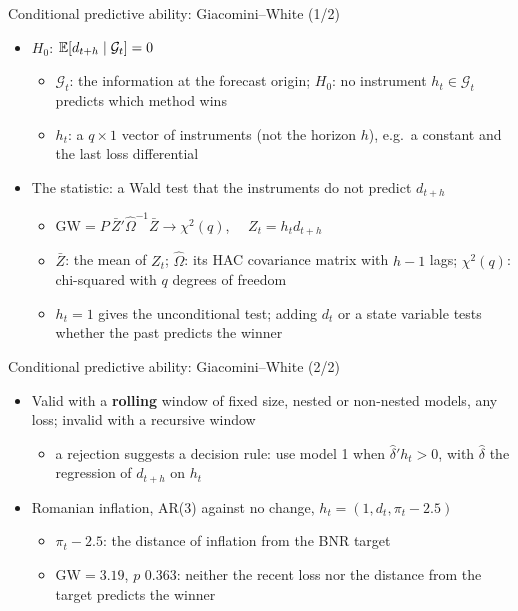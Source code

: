 \begin{frame}{Conditional predictive ability: Giacomini--White (1/2)}
\itemsize{\small}
\begin{itemize}
    \item $H_0$: $\mathbb{E}[d_{t+h} \mid \mathcal{G}_t] = 0$ 
    \begin{itemize}
        \item $\mathcal{G}_t$: the information at the forecast origin; $H_0$: no instrument $h_t \in \mathcal{G}_t$ predicts which method wins
        \item $h_t$: a $q \times 1$ vector of instruments (not the horizon $h$), e.g.\ a constant and the last loss differential
    \end{itemize}
    \item The statistic: a Wald test that the instruments do not predict $d_{t+h}$
    \begin{itemize}
        \item $\mathrm{GW} = P\,\bar Z'\hat\Omega^{-1}\bar Z \to \chi^2(q)$, $\quad Z_t = h_t d_{t+h}$
        \item $\bar Z$: the mean of $Z_t$; $\hat\Omega$: its HAC covariance matrix with $h - 1$ lags; $\chi^2(q)$: chi-squared with $q$ degrees of freedom
        \item $h_t = 1$ gives the unconditional test; adding $d_t$ or a state variable tests whether the past predicts the winner
    \end{itemize}
\end{itemize}
\end{frame}

\begin{frame}{Conditional predictive ability: Giacomini--White (2/2)}
\itemsize{\small}
\begin{itemize}
    \item Valid with a \textbf{rolling} window of fixed size, nested or non-nested models, any loss; invalid with a recursive window
    \begin{itemize}
        \item a rejection suggests a decision rule: use model 1 when $\hat\delta'h_t > 0$, with $\hat\delta$ the regression of $d_{t+h}$ on $h_t$
    \end{itemize}
    \item Romanian inflation, AR(3) against no change, $h_t = (1, d_t, \pi_t - 2.5)$
    \begin{itemize}
        \item $\pi_t - 2.5$: the distance of inflation from the BNR target
        \item $\mathrm{GW} = 3.19$, $p$ 0.363: neither the recent loss nor the distance from the target predicts the winner
    \end{itemize}
\end{itemize}
\end{frame}

